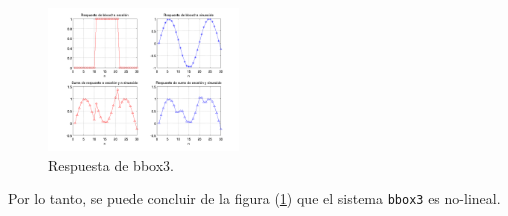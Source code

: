 \documentclass[10pt,conference,a4paper]{IEEEtran}
\begin{document}
\begin{figure}[H]
  \centering
  \includegraphics[width=0.45\textwidth]{../img/img6.png}
  \caption{Respuesta de bbox3.}
  \label{fig:img6}
\end{figure}

Por lo tanto, se puede concluir de la figura (\ref{fig:img6}) que el sistema 
\verb|bbox3| es no-lineal.
\end{document}
